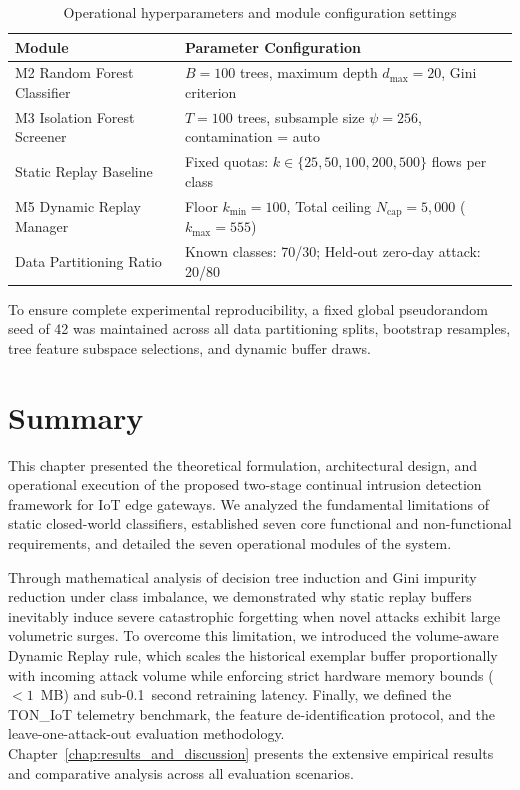 \begin{table}[htpb]
\centering
\small
\renewcommand{\arraystretch}{1.3}
\caption{Operational hyperparameters and module configuration settings}
\label{tab:hyperparameters}
\begin{tabular}{|p{4.5cm}|p{8.2cm}|}
\hline
\textbf{Module} & \textbf{Parameter Configuration} \\ \hline
M2 Random Forest Classifier & $B = 100$ trees, maximum depth $d_{\max} = 20$, Gini criterion \\
M3 Isolation Forest Screener & $T = 100$ trees, subsample size $\psi = 256$, contamination = auto \\
Static Replay Baseline     & Fixed quotas: $k \in \{25, 50, 100, 200, 500\}$ flows per class \\
M5 Dynamic Replay Manager  & Floor $k_{\min} = 100$, Total ceiling $N_{\text{cap}} = 5{,}000$ ($k_{\max} = 555$) \\
Data Partitioning Ratio    & Known classes: 70/30; Held-out zero-day attack: 20/80 \\ \hline
\end{tabular}
\end{table}

To ensure complete experimental reproducibility, a fixed global pseudorandom seed of 42 was maintained across all data partitioning splits, bootstrap resamples, tree feature subspace selections, and dynamic buffer draws.

\section{Summary}
\label{sec:summary_proposed_work}

This chapter presented the theoretical formulation, architectural design, and operational execution of the proposed two-stage continual intrusion detection framework for IoT edge gateways. We analyzed the fundamental limitations of static closed-world classifiers, established seven core functional and non-functional requirements, and detailed the seven operational modules of the system. 

Through mathematical analysis of decision tree induction and Gini impurity reduction under class imbalance, we demonstrated why static replay buffers inevitably induce severe catastrophic forgetting when novel attacks exhibit large volumetric surges. To overcome this limitation, we introduced the volume-aware Dynamic Replay rule, which scales the historical exemplar buffer proportionally with incoming attack volume while enforcing strict hardware memory bounds ($< 1$~MB) and sub-0.1~second retraining latency. Finally, we defined the TON\_IoT telemetry benchmark, the feature de-identification protocol, and the leave-one-attack-out evaluation methodology. Chapter~\ref{chap:results_and_discussion} presents the extensive empirical results and comparative analysis across all evaluation scenarios.
